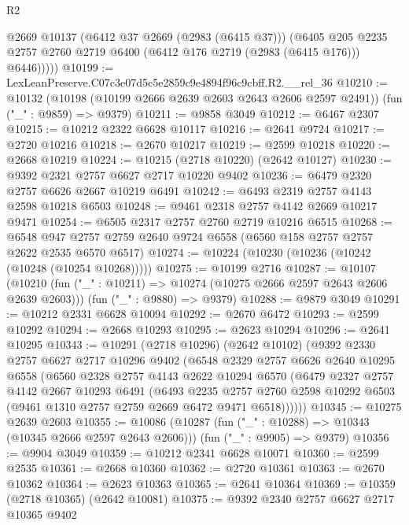 \begin{lexlean}{R2}
\begin{coremodule}
            @2669
            @10137
            (@6412 @37 @2669 (@2983 (@6415 @37)))
            (@6405
              @205
              @2235
              @2757
              @2760
              @2719
              @6400
              (@6412 @176 @2719 (@2983 (@6415 @176)))
              @6446)))))
@10199 := LexLeanPreserve.C07c3e07d5c5e2859c9e4894f96c9cbff.R2.__rel_36
@10210 := @10132
    (@10198 (@10199 @2666 @2639 @2603 @2643 @2606 @2597 @2491))
    (fun ("_" : @9859) => @9379)
@10211 := @9858 @3049
@10212 := @6467 @2307
@10215 := @10212 @2322 @6628 @10117
@10216 := @2641 @9724
@10217 := @2720 @10216
@10218 := @2670 @10217
@10219 := @2599 @10218
@10220 := @2668 @10219
@10224 := @10215 (@2718 @10220) (@2642 @10127)
@10230 := @9392 @2321 @2757 @6627 @2717 @10220 @9402
@10236 := @6479 @2320 @2757 @6626 @2667 @10219 @6491
@10242 := @6493 @2319 @2757 @4143 @2598 @10218 @6503
@10248 := @9461 @2318 @2757 @4142 @2669 @10217 @9471
@10254 := @6505 @2317 @2757 @2760 @2719 @10216 @6515
@10268 := @6548 @947 @2757 @2759 @2640 @9724 @6558 (@6560 @158 @2757 @2757 @2622 @2535 @6570 @6517)
@10274 := @10224 (@10230 (@10236 (@10242 (@10248 (@10254 @10268)))))
@10275 := @10199 @2716
@10287 := @10107
    (@10210 (fun ("_" : @10211) => @10274 (@10275 @2666 @2597 @2643 @2606 @2639 @2603)))
    (fun ("_" : @9880) => @9379)
@10288 := @9879 @3049
@10291 := @10212 @2331 @6628 @10094
@10292 := @2670 @6472
@10293 := @2599 @10292
@10294 := @2668 @10293
@10295 := @2623 @10294
@10296 := @2641 @10295
@10343 := @10291
    (@2718 @10296)
    (@2642 @10102)
    (@9392
      @2330
      @2757
      @6627
      @2717
      @10296
      @9402
      (@6548
        @2329
        @2757
        @6626
        @2640
        @10295
        @6558
        (@6560
          @2328
          @2757
          @4143
          @2622
          @10294
          @6570
          (@6479
            @2327
            @2757
            @4142
            @2667
            @10293
            @6491
            (@6493
              @2235
              @2757
              @2760
              @2598
              @10292
              @6503
              (@9461 @1310 @2757 @2759 @2669 @6472 @9471 @6518))))))
@10345 := @10275 @2639 @2603
@10355 := @10086
    (@10287 (fun ("_" : @10288) => @10343 (@10345 @2666 @2597 @2643 @2606)))
    (fun ("_" : @9905) => @9379)
@10356 := @9904 @3049
@10359 := @10212 @2341 @6628 @10071
@10360 := @2599 @2535
@10361 := @2668 @10360
@10362 := @2720 @10361
@10363 := @2670 @10362
@10364 := @2623 @10363
@10365 := @2641 @10364
@10369 := @10359 (@2718 @10365) (@2642 @10081)
@10375 := @9392 @2340 @2757 @6627 @2717 @10365 @9402

\end{coremodule}
\end{lexlean}
